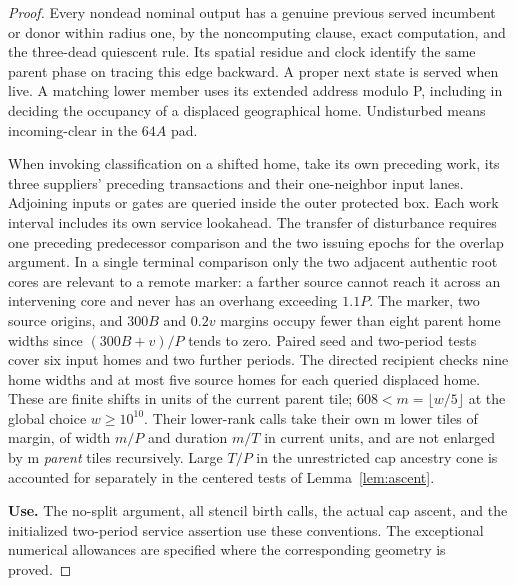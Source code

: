 \begin{proof}
Every nondead nominal output has a genuine previous served incumbent or donor within radius one, by the noncomputing clause, exact computation, and the three-dead quiescent rule. Its spatial residue and clock identify the same parent phase on tracing this edge backward. A proper next state is served when live. A matching lower member uses its extended address modulo P, including in deciding the occupancy of a displaced geographical home. Undisturbed means incoming-clear in the \(64A\) pad.

When invoking classification on a shifted home, take its own preceding work, its three suppliers' preceding transactions and their one-neighbor input lanes. Adjoining inputs or gates are queried inside the outer protected box. Each work interval includes its own service lookahead. The transfer of disturbance requires one preceding predecessor comparison and the two issuing epochs for the overlap argument. In a single terminal comparison only the two adjacent authentic root cores are relevant to a remote marker: a farther source cannot reach it across an intervening core and never has an overhang exceeding \(1.1P\). The marker, two source origins, and \(300B\) and \(0.2v\) margins occupy fewer than eight parent home widths since \((300B+v)/P\) tends to zero. Paired seed and two-period tests cover six input homes and two further periods. The directed recipient checks nine home widths and at most five source homes for each queried displaced home. These are finite shifts in units of the current parent tile; \(608<m=\lfloor w/5\rfloor\) at the global choice \(w\ge10^{10}\). Their lower-rank calls take their own m lower tiles of margin, of width \(m/P\) and duration \(m/T\) in current units, and are not enlarged by m \emph{parent} tiles recursively. Large \(T/P\) in the unrestricted cap ancestry cone is accounted for separately in the centered tests of Lemma~\ref{lem:ascent}.

\textbf{Use.} The no-split argument, all stencil birth calls, the actual cap ascent, and the initialized two-period service assertion use these conventions. The exceptional numerical allowances are specified where the corresponding geometry is proved.


\end{proof}

